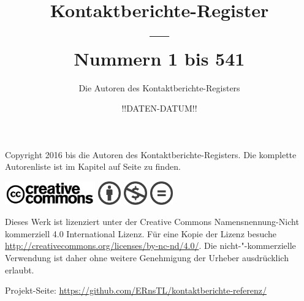 \documentclass[ngerman,10pt]{book}
\title{Kontaktberichte-Register \\ --- \\ \Large{Nummern 1 bis 541}}
\author{Die Autoren des Kontaktberichte-Registers}
\date{!!DATEN-DATUM!!}%
\begin{document}
\frontmatter



\maketitle




\thispagestyle{empty}
\null    %
\vfill

\noindent Copyright {\textcopyright} 2016 bis {\the\year} die Autoren des Kontaktberichte-Registers. Die komplette Autorenliste ist im Kapitel \emph{} auf Seite \pageref{ch:mitwirkende} zu finden.%

\vspace{2mm}

\includegraphics[height=10mm,keepaspectratio=true]{CreativeCommons_logo_trademark}
\includegraphics[height=10mm,keepaspectratio=true]{chooser_by} \includegraphics[height=10mm,keepaspectratio=true]{chooser_nc} \includegraphics[height=10mm,keepaspectratio=true]{chooser_nd}

\vspace{2mm}

\noindent Dieses Werk ist lizenziert unter der Creative Commons Namensnennung-Nicht kommerziell 4.0 International Lizenz. Für eine Kopie der Lizenz besuche \url{http://creativecommons.org/licenses/by-nc-nd/4.0/}. Die nicht-"-kommerzielle Verwendung ist daher ohne weitere Genehmigung der Urheber ausdrücklich erlaubt.

\vspace{2mm}

\noindent Projekt-Seite: \url{https://github.com/ERnsTL/kontaktberichte-referenz/}

\vspace{2mm}
\end{document}
